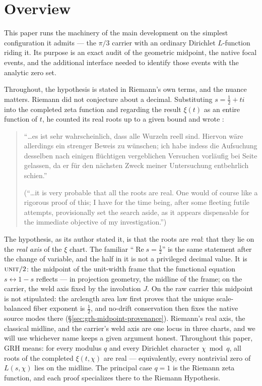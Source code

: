 \documentclass[11pt]{article}
\theoremstyle{definition}
\renewcommand{\Re}{\operatorname{Re}}
\begin{document}
\tableofcontents

\section{Overview}\label{sec:grh-overview}

This paper runs the machinery of the main development \cite{UniversalCarrier}
on the simplest configuration it
admits --- the \(\pi/3\) carrier with an ordinary Dirichlet \(L\)-function
riding it.  Its purpose is an exact audit of the geometric midpoint, the
native focal events, and the additional interface needed to identify those
events with the analytic zero set.

Throughout, the hypothesis is stated in Riemann's own terms, and the nuance
matters. Riemann did not conjecture about a decimal. Substituting
\(s=\tfrac12+ti\) into the completed zeta function and regarding the result
\(\xi(t)\) as an entire function of \(t\), he counted its real roots up to a
given bound and wrote \cite{Riemann1859}:
\begin{quote}
``\ldots es ist sehr wahrscheinlich, dass alle Wurzeln reell sind. Hiervon
w\"are allerdings ein strenger Beweis zu w\"unschen; ich habe indess die
Aufsuchung desselben nach einigen fl\"uchtigen vergeblichen Versuchen
vorl\"aufig bei Seite gelassen, da er f\"ur den n\"achsten Zweck meiner
Untersuchung entbehrlich schien.''

(``\ldots it is very probable that all the roots are real. One would of
course like a rigorous proof of this; I have for the time being, after some
fleeting futile attempts, provisionally set the search aside, as it appears
dispensable for the immediate objective of my investigation.'')
\end{quote}
The hypothesis, as its author stated it, is that the roots are \emph{real}:
that they lie on the \emph{real axis} of the \(\xi\) chart. The familiar
``\(\Re s=\tfrac12\)'' is the same statement after the change of variable,
and the half in it is not a privileged decimal value. It is
\(\textsc{unit}/2\): the midpoint of the unit-width frame that the functional
equation \(s\leftrightarrow1-s\) reflects --- in projection geometry, the
midline of the frame; on the carrier, the weld axis fixed by the involution
\(J\).  On the raw carrier this midpoint is not stipulated: the arclength
area law first proves that the unique scale-balanced fiber exponent is
\(\tfrac12\), and no-drift conservation then fixes the native source modes
there (\S\ref{sec:grh-midpoint-provenance}). Riemann's real axis, the
classical midline, and the carrier's weld
axis are one locus in three charts, and we will use whichever name keeps a
given argument honest. Throughout this paper, GRH means: for every modulus
\(q\) and every Dirichlet character \(\chi\bmod q\), all roots of the
completed \(\xi(t,\chi)\) are real --- equivalently, every nontrivial zero of
\(L(s,\chi)\) lies on the midline. The principal case \(q=1\) is the Riemann
zeta function, and each proof specializes there to the Riemann Hypothesis.
\end{document}
